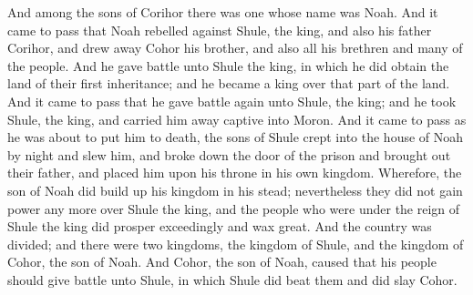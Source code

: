 And among the sons of Corihor there was one whose name was Noah.
\bverse \iffalse And it came to pass that Noah rebelled against Shule, the king, and also his father Corihor, and drew away Cohor his brother, and also all his brethren and many of the people. \fi
And it came to pass that Noah rebelled against Shule, the king, and also his father Corihor, and drew away Cohor his brother, and also all his brethren and many of the people.
\bverse \iffalse And he gave battle unto Shule the king, in which he did obtain the land of their first inheritance; and he became a king over that part of the land. \fi
And he gave battle unto Shule the king, in which he did obtain the land of their first inheritance; and he became a king over that part of the land.
\bverse \iffalse And it came to pass that he gave battle again unto Shule, the king; and he took Shule, the king, and carried him away captive into Moron. \fi
And it came to pass that he gave battle again unto Shule, the king; and he took Shule, the king, and carried him away captive into Moron.
\bverse \iffalse And it came to pass as he was about to put him to death, the sons of Shule crept into the house of Noah by night and slew him, and broke down the door of the prison and brought out their father, and placed him upon his throne in his own kingdom. \fi
And it came to pass as he was about to put him to death, the sons of Shule crept into the house of Noah by night and slew him, and broke down the door of the prison and brought out their father, and placed him upon his throne in his own kingdom.
\bverse \iffalse Wherefore, the son of Noah did build up his kingdom in his stead; nevertheless they did not gain power any more over Shule the king, and the people who were under the reign of Shule the king did prosper exceedingly and wax great. \fi
Wherefore, the son of Noah did build up his kingdom in his stead; nevertheless they did not gain power any more over Shule the king, and the people who were under the reign of Shule the king did prosper exceedingly and wax great.
\bverse \iffalse And the country was divided; and there were two kingdoms, the kingdom of Shule, and the kingdom of Cohor, the son of Noah. \fi
And the country was divided; and there were two kingdoms, the kingdom of Shule, and the kingdom of Cohor, the son of Noah.
\bverse \iffalse And Cohor, the son of Noah, caused that his people should give battle unto Shule, in which Shule did beat them and did slay Cohor. \fi
And Cohor, the son of Noah, caused that his people should give battle unto Shule, in which Shule did beat them and did slay Cohor.
